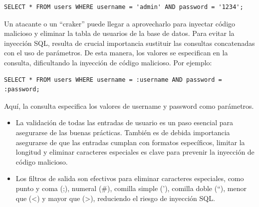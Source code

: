 \documentclass[11pt]{report}
\begin{document}
\begin{center}
\begin{BVerbatim}
SELECT * FROM users WHERE username = 'admin' AND password = '1234';
\end{BVerbatim}
\end{center}

Un atacante o un “craker” puede llegar a aprovecharlo para inyectar código malicioso y eliminar la tabla
de usuarios de la base de datos.
Para evitar la inyección SQL, resulta de crucial importancia sustituir las consultas concatenadas con el
uso de parámetros. De esta manera, los valores se especifican en la consulta, dificultando la inyección
de código malicioso. Por ejemplo:

\begin{center}
\begin{BVerbatim}
SELECT * FROM users WHERE username = :username AND password = :password;
\end{BVerbatim}
\end{center}

Aquí, la consulta especifica los valores de username y password como parámetros.
\begin{itemize}
  \item La validación de todas las entradas de usuario es un paso esencial para asegurarse de las buenas
  prácticas. También es de debida importancia asegurarse de que las entradas cumplan con formatos específicos,
  limitar la longitud y eliminar caracteres especiales es clave para prevenir la inyección de código malicioso.
  
  \item Los filtros de salida son efectivos para eliminar caracteres especiales, como punto y coma (;), numeral (\#),
  comilla simple ('), comilla doble (“), menor que (<) y mayor que (>), reduciendo el riesgo de inyección SQL.
\end{itemize}
\end{document}
